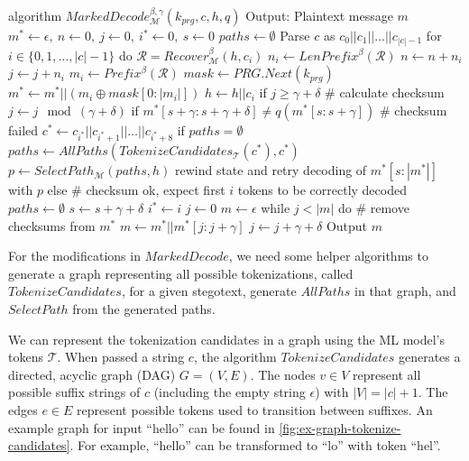 \begin{Pseudocode}[caption={
Marked Decode Algorithm.
In comparison to Meteor's $Decode$ algorithm, MarkedDecode checks the checksum every $\gamma$ bits. 
If the checksum does not match, a decoding error happened.
We then perform a lookbehind on the stegotext and generate all possible tokenizations $paths$ for a substring of $c$.
Afterwards, rewind the internal state and retry decoding with a path $p$ selected from $paths$.
}, label={alg:marked-decode}]
algorithm $MarkedDecode_{\mathcal{M}}^{\beta,\gamma}(k_{prg}, c, h, q)$
	Output: Plaintext message $m$
	$m^* \leftarrow \epsilon,~ n \leftarrow 0,~ j \leftarrow 0,~ i^* \leftarrow 0,~ s \leftarrow 0$
	$paths \leftarrow \emptyset$
	Parse $c$ as $c_0 || c_1 || \dots || c_{|c|-1}$
	for $i \in \{0, 1, \dots, |c|-1 \}$ do
		$\mathcal{R} = Recover_{\mathcal{M}}^\beta(h, c_i)$
		$n_i \leftarrow LenPrefix^\beta(\mathcal{R})$
		$n \leftarrow n + n_i$
		$j \leftarrow j + n_i$
		$m_i \leftarrow Prefix^\beta(\mathcal{R})$
		$mask \leftarrow PRG.Next(k_{prg})$
		$m^* \leftarrow m^* || (m_i \oplus mask[0: |m_i|])$
		$h \leftarrow h||c_i$
		if $j \geq \gamma + \delta$
			# calculate checksum
			$j \leftarrow j \mod (\gamma+\delta)$
			if $m^*[s+\gamma:s+\gamma+\delta] \neq q(m^*[s:s+\gamma])$  # checksum failed
				$c^* \leftarrow c_{i^*} || c_{i^*+1} || \dots || c_{i^*+8}$
				if $paths = \emptyset$
					$paths \leftarrow AllPaths(TokenizeCandidates_{\mathcal{T}}(c^*), c^*)$
				$p \leftarrow SelectPath_{\mathcal{M}}(paths, h)$
				rewind state and retry decoding of $m^*[s:|m^*|]$ with $p$
			else  # checksum ok, expect first $i$ tokens to be correctly decoded
				$paths \leftarrow \emptyset$
				$s \leftarrow s + \gamma + \delta$
				$i^* \leftarrow i$
	$j \leftarrow 0$
	$m \leftarrow \epsilon$
	while $j < |m|$ do  # remove checksums from $m^*$
		$m \leftarrow m^* || m^*[j: j + \gamma]$
		$j \leftarrow j + \gamma + \delta$
	Output $m$
\end{Pseudocode}

For the modifications in $MarkedDecode$, we need some helper algorithms to generate a graph representing all possible tokenizations, called $TokenizeCandidates$, for a given stegotext, generate $AllPaths$ in that graph, and $SelectPath$ from the generated paths.

We can represent the tokenization candidates in a graph using the ML model's tokens $\mathcal{T}$.
When passed a string $c$, the algorithm $TokenizeCandidates$ generates a directed, acyclic graph (DAG) $G = (V, E)$.
The nodes $v \in V$ represent all possible suffix strings of $c$ (including the empty string $\epsilon$) with $|V| = |c| + 1$.
The edges $e \in E$ represent possible tokens used to transition between suffixes.
An example graph for input ``hello'' can be found in \autoref{fig:ex-graph-tokenize-candidates}.
For example, ``hello'' can be transformed to ``lo'' with token ``hel''.

